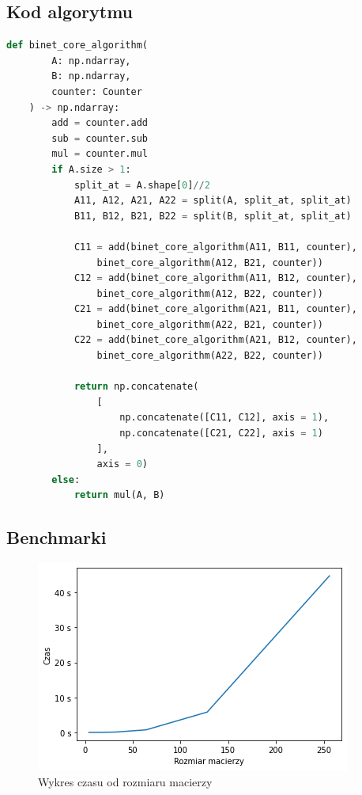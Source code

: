 \documentclass[12pt,a4paper,table]{article}
\begin{document}
    \subsection{Kod algorytmu}
    \begin{lstlisting}[language=Python]
    def binet_core_algorithm(
        A: np.ndarray, 
        B: np.ndarray, 
        counter: Counter
    ) -> np.ndarray:
        add = counter.add
        sub = counter.sub
        mul = counter.mul
        if A.size > 1:
            split_at = A.shape[0]//2
            A11, A12, A21, A22 = split(A, split_at, split_at)
            B11, B12, B21, B22 = split(B, split_at, split_at)
            
            C11 = add(binet_core_algorithm(A11, B11, counter), 
                binet_core_algorithm(A12, B21, counter))
            C12 = add(binet_core_algorithm(A11, B12, counter), 
                binet_core_algorithm(A12, B22, counter))
            C21 = add(binet_core_algorithm(A21, B11, counter), 
                binet_core_algorithm(A22, B21, counter))
            C22 = add(binet_core_algorithm(A21, B12, counter), 
                binet_core_algorithm(A22, B22, counter))
            
            return np.concatenate(
                [
                    np.concatenate([C11, C12], axis = 1),
                    np.concatenate([C21, C22], axis = 1)
                ],
                axis = 0)
        else:
            return mul(A, B)
    \end{lstlisting}

    \subsection{Benchmarki}

    \begin{figure}[H]
        \centering
        \includegraphics[width=0.6\linewidth]{img/binet_times.png}
        \caption{Wykres czasu od rozmiaru macierzy}
        \label{fig:binet_times}
    \end{figure}
\end{document}
